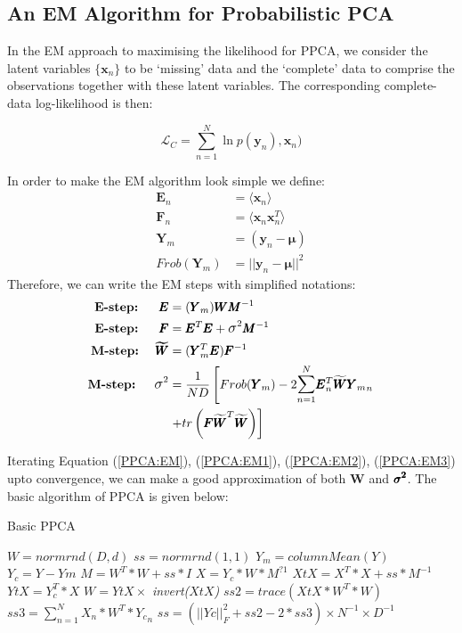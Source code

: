 \documentclass[10pt,conference,letterpaper]{IEEEtran}
\begin{document}
\subsection{An EM Algorithm for Probabilistic PCA}
In the EM approach to maximising the likelihood for PPCA, we consider the latent variables  $\{\pmb{x}_n\}$ to be `missing' data and the `complete' data to comprise the observations together with these latent variables. The corresponding complete-data log-likelihood is then:

\begin{equation}
\label{PPCA:eq22}
\mathcal{L}_C = \sum^N_{n=1} \ln {p(\pmb{y}_n),\pmb{x}_n)} 
\end{equation}

In order to make the EM algorithm look simple we define:
\begin{align*}
\pmb{E}_n &= \langle \pmb{x}_n \rangle\\
\pmb{F}_n &= \langle \pmb{x}_n\pmb{x}_n^T \rangle\\
\pmb{Y}_m &= (\pmb{y}_n - \pmb{\mu})\\
{Frob(\pmb{Y}_m)} &= || \pmb{y}_n - \pmb{\mu} ||^2
\end{align*}
Therefore, we can write the EM steps with simplified notations:
\begin{align}
\label{PPCA:EM}
\text{\textbf{E-step:}} \ \ \ \ \  \pmb{E} &= (\pmb{Y}_{m})\pmb{W}\pmb{M}^{-1} \\
\label{PPCA:EM1}
\text{\textbf{E-step:}} \ \ \ \ \  \pmb{F} &= \pmb{E}^T\pmb{E} + \mathlarger{\sigma}^2\pmb{M}^{-1}\\
\label{PPCA:EM2}
\text{\textbf{M-step:}} \ \ \ \ \pmb{\widetilde{W}} &= (\pmb{Y}_m^T\pmb{E})\pmb{F}^{-1} \\
\label{PPCA:EM3}
\text{\textbf{M-step: }}\ \ \ \mathlarger{\sigma}^2 &= \dfrac{1}{ND} \left[    Frob(\pmb{Y}_m) - 2 \mathlarger{\sum}^N_{n=1} \pmb{E}_n^T \widetilde{\pmb{W}}{\pmb{Y}_m}_n \right.\\& \left.+ tr \left(\pmb{F} \widetilde{\pmb{W}}^T\widetilde{\pmb{W}}  \right) \right] \nonumber
\end{align}

Iterating Equation (\ref{PPCA:EM}), (\ref{PPCA:EM1}), (\ref{PPCA:EM2}), (\ref{PPCA:EM3}) upto convergence, we can make a good approximation of both $\pmb{W}$ and $\pmb{\mathlarger{\sigma}^2}$.
The basic algorithm of PPCA is given below:

\begin{algorithm}[!htbp]
\label{basic}
\caption{Basic PPCA}
\begin{algorithmic}[1]
\State $W = normrnd(D,d)$
\State $ss=normrnd(1,1)$
\State $Y_m=columnMean(Y)$
\State  $Y_c=Y-Ym$
	\State $M = W^T * W + ss * I$
	\State $X = Y_c * W * M^{?1}$
	\State $XtX = X^T * X + ss * M^{-1}$
	\State $YtX = Y_c^T * X$
	\State $W = YtX \times$ \textit{invert($XtX$)}
	\State $ss2 = trace(XtX * W^T * W)$
	\State $ss3= \sum_{n=1}^N X_n * W^T * {Y_c}_n$
	\State $ss = (||Y c||^2_F + ss2-2 * ss3)\times N^{-1} \times D^{-1}$
\EndWhile
\end{algorithmic}
\end{algorithm}
\end{document}
